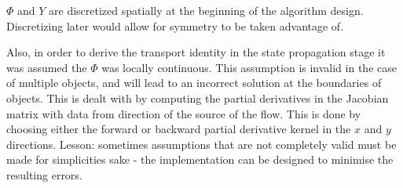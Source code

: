 $\Phi$ and $Y$ are discretized spatially at the beginning of the algorithm design. Discretizing later would allow for symmetry to be taken advantage of.

Also, in order to derive the transport identity in the state propagation stage it was assumed the $\Phi$ was locally continuous. This assumption is invalid in the case of multiple objects, and will lead to an incorrect solution at the boundaries of objects. This is dealt with by computing the partial derivatives in the Jacobian matrix with data from direction of the source of the flow. This is done by choosing either the forward or backward partial derivative kernel in the $x$ and $y$ directions. Lesson: sometimes assumptions that are not completely valid must be made for simplicities sake - the implementation can be designed to minimise the resulting errors.



